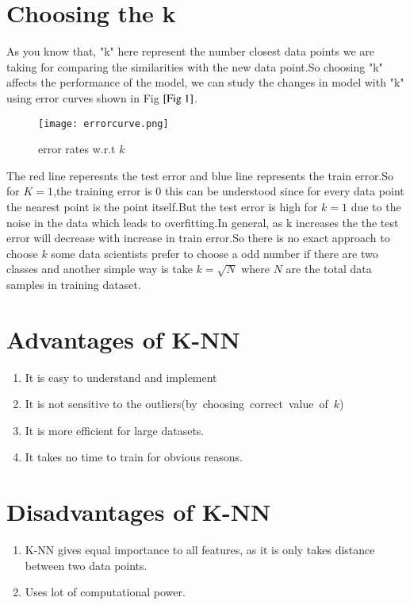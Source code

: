 \documentclass[journal,12pt,onecolumn]{IEEEtran}
\theoremstyle{remark}
\numberwithin{equation}{section}
\begin{document}
	       \section{Choosing the k}
	       As you know that, "k" here represent the number closest data points we are taking for comparing the similarities with the new data point.So choosing "k" affects the performance of the model, we can study the changes in model with "k" using error curves shown in Fig $\ref{Fig 1}$.
	       \begin{figure}
		 \centering
		 \texttt{[image: errorcurve.png]}
		 \caption{error rates w.r.t $k$}
		 \label{Fig 1}
	       \end{figure}
       The red line reperesnts the test error and blue line represents the train error.So for $K=1$,the training error is $0$ this can be understood since for every data point the nearest point is the point itself.But the test error is high for $k=1$ due to the noise in the data which leads to overfitting.In general, as k increases the 
	the test error will decrease with increase in train error.So there is no exact approach to choose $k$ some data scientists prefer to choose a odd number if there are two classes and another simple way is take $k =\sqrt{N}$ where $N$ are the total data samples in training dataset.
	       \section{Advantages of K-NN}
	        \begin{enumerate}
		 \item It is easy to understand and implement
	         \item It is not sensitive to the outliers(by\, choosing\, correct\, value\, of\, $k$)
	         \item It is more efficient for large datasets.
	         \item It takes no time to train for obvious reasons.
	        \end{enumerate}
	       \section{Disadvantages of K-NN}
	        \begin{enumerate}
		 \item K-NN gives equal importance to all features, as it is only takes distance between two data points.
	         \item Uses lot of computational power.
	        \end{enumerate}
\end{document}
